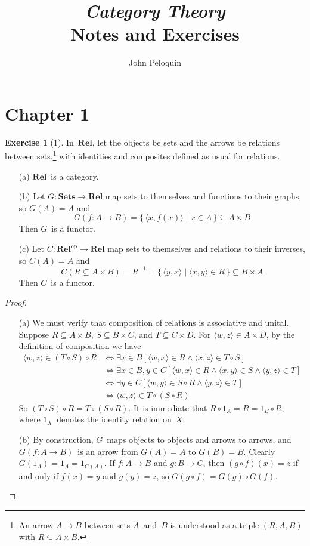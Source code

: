 \documentclass[letterpaper,12pt]{article}
\title{\textit{Category Theory}\\Notes and Exercises}
\author{John Peloquin}
\date{}
\newcommand{\Rel}{\mathbf{Rel}}
\newcommand{\Sets}{\mathbf{Sets}}
\newcommand{\pair}[2]{\langle{#1},{#2}\rangle}
\newcommand{\dual}[1]{#1^{\mathrm{op}}}
\theoremstyle{definition}
\newtheorem*{exer}{Exercise}
\theoremstyle{remark}
\theoremstyle{direction}
\begin{document}
\maketitle

\section*{Chapter 1}
\begin{exer}[1]
In~\(\Rel\), let the objects be sets and the arrows be relations between sets,\footnote{An arrow \(A\to B\) between sets \(A\)~and~\(B\) is understood as a triple \((R,A,B)\) with \(R\subseteq A\times B\).} with identities and composites defined as usual for relations.
\begin{enumerate}[itemsep=0pt]
\item[(a)] \(\Rel\)~is a category.
\item[(b)] Let \(G:\Sets\to\Rel\) map sets to themselves and functions to their graphs, so \(G(A)=A\) and
\[G(f:A\to B)=\{\,\pair{x}{f(x)}\mid x\in A\,\}\subseteq A\times B\]
Then \(G\)~is a functor.
\item[(c)] Let \(C:\dual{\Rel}\to\Rel\) map sets to themselves and relations to their inverses, so \(C(A)=A\) and
\[C(R\subseteq A\times B)=R^{-1}=\{\,\pair{y}{x}\mid\pair{x}{y}\in R\,\}\subseteq B\times A\]
Then \(C\)~is a functor.
\end{enumerate}
\begin{proof}\
\begin{enumerate}[itemsep=0pt]
\item[(a)] We must verify that composition of relations is associative and unital. Suppose \(R\subseteq A\times B\), \(S\subseteq B\times C\), and \(T\subseteq C\times D\). For \(\pair{w}{z}\in A\times D\), by the definition of composition we have
\begin{align*}
\pair{w}{z}\in(T\circ S)\circ R&\iff\exists x\in B[\pair{w}{x}\in R\land\pair{x}{z}\in T\circ S]\\
								&\iff\exists x\in B,y\in C[\pair{w}{x}\in R\land\pair{x}{y}\in S\land\pair{y}{z}\in T]\\
								&\iff\exists y\in C[\pair{w}{y}\in S\circ R\land\pair{y}{z}\in T]\\
								&\iff\pair{w}{z}\in T\circ(S\circ R)
\end{align*}
So \((T\circ S)\circ R=T\circ(S\circ R)\). It is immediate that \(R\circ 1_A=R=1_B\circ R\), where \(1_X\)~denotes the identity relation on~\(X\).
\item[(b)] By construction, \(G\)~maps objects to objects and arrows to arrows, and \(G(f:A\to B)\)~is an arrow from \(G(A)=A\) to \(G(B)=B\). Clearly \(G(1_A)=1_A=1_{G(A)}\). If \(f:A\to B\) and \(g:B\to C\), then \((g\circ f)(x)=z\) if and only if \(f(x)=y\) and \(g(y)=z\), so \(G(g\circ f)=G(g)\circ G(f)\).

\end{enumerate}
\end{proof}
\end{exer}
\end{document}

